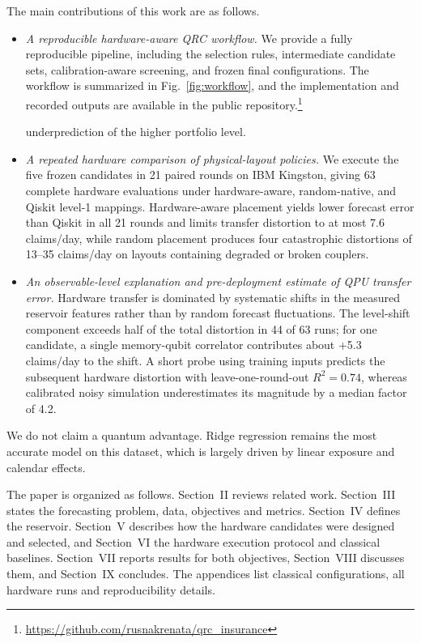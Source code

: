 \documentclass[journal]{IEEEtran}
\begin{document}
The main contributions of this work are as follows.
\begin{itemize}

\item \emph{A reproducible hardware-aware QRC workflow.}
We provide a fully reproducible pipeline, including the selection rules, intermediate candidate sets, calibration-aware screening, and frozen final configurations. The workflow is summarized in Fig.~\ref{fig:workflow}, and the implementation and recorded outputs are available in the public repository.\footnote{\url{https://github.com/rusnakrenata/qrc_insurance}}

underprediction of the higher portfolio level.


\item \emph{A repeated hardware comparison of physical-layout policies.}
We execute the five frozen candidates in 21 paired rounds on IBM Kingston, giving 63 complete hardware evaluations under hardware-aware, random-native, and Qiskit level-1 mappings. Hardware-aware placement yields lower forecast error than Qiskit in all 21 rounds and limits transfer distortion to at most 7.6 claims/day, while random placement produces four catastrophic distortions of 13--35 claims/day on layouts containing degraded or broken couplers.

\item \emph{An observable-level explanation and pre-deployment estimate of QPU transfer error.}
Hardware transfer is dominated by systematic shifts in the measured reservoir features rather than by random forecast fluctuations. The level-shift component exceeds half of the total distortion in 44 of 63 runs; for one candidate, a single memory-qubit correlator contributes about +5.3 claims/day to the shift. A short probe using training inputs predicts the subsequent hardware distortion with leave-one-round-out $R^2=0.74$, whereas calibrated noisy simulation underestimates its magnitude by a median factor of 4.2.

\end{itemize}
We do not claim a quantum advantage. Ridge regression remains the most accurate model on this dataset, which is largely driven by linear exposure and calendar effects.

The paper is organized as follows. Section~II reviews related work. Section~III states the forecasting problem, data, objectives and metrics. Section~IV defines the reservoir. Section~V describes how the hardware candidates were designed and selected, and Section~VI the hardware execution protocol and classical baselines. Section~VII reports results for both objectives, Section~VIII discusses them, and Section~IX concludes. The appendices list classical configurations, all hardware runs and reproducibility details.
\end{document}
